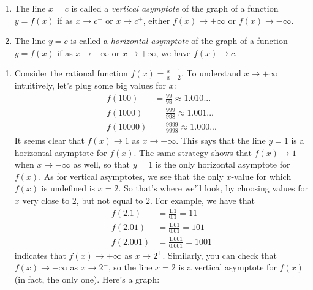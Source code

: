 \documentclass{ximera}
\begin{document}
\begin{definition}
  \mbox{}
  \begin{enumerate}
  \item The line $x=c$ is called a \emph{vertical asymptote} of the graph of a function $y=f(x)$ if as $x \to c^-$ or $x \to c^+$, either $f(x) \to +\infty$ or $f(x) \to -\infty$.
  \item The line $y=c$ is called a \emph{horizontal asymptote} of the graph of a function $y=f(x)$ if as $x \to -\infty$ or $x \to +\infty$, we have $f(x) \to c$.
  \end{enumerate}
\end{definition}


\begin{example}
  \mbox{}
  \begin{enumerate}
  \item Consider the rational function $f(x) = \frac{x-1}{x-2}$. To understand $x\to +\infty$ intuitively, let's plug some big values for $x$:
    \begin{align*}
      f(100) &= \frac{99}{98} \approx 1.010... \\ f(1000) &= \frac{999}{998} \approx 1.001... \\ f(10000) &= \frac{9999}{9998} \approx 1.000...
    \end{align*}It seems clear that $f(x) \to 1$ as $x \to +\infty$. This says that the line $y=1$ is a horizontal asymptote for $f(x)$. The same strategy shows that $f(x) \to 1$ when $x \to -\infty$ as well, so that $y=1$ is the only horizontal asymptote for $f(x)$. As for vertical asymptotes, we see that the only $x$-value for which $f(x)$ is undefined is $x=2$. So that's where we'll look, by choosing values for $x$ very close to $2$, but not equal to $2$. For example, we have that
    \begin{align*}
      f(2.1) &= \frac{1.1}{0.1} = 11 \\ f(2.01) &= \frac{1.01}{0.01} = 101 \\ f(2.001) &= \frac{1.001}{0.001} = 1001 
    \end{align*}
    indicates that $f(x) \to +\infty$ as $x \to 2^+$. Similarly, you can check that $f(x) \to -\infty$ as $x \to 2^-$, so the line $x=2$ is a vertical asymptote for $f(x)$ (in fact, the only one). Here's a graph:

\begin{image}
\end{image}


\end{enumerate}
\end{example}
\end{document}
